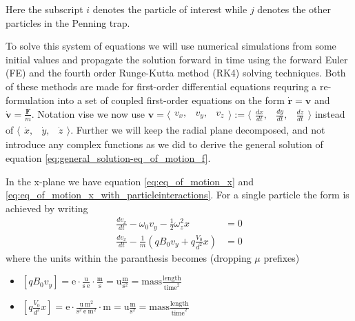 \documentclass[../main_proj3.tex]{subfiles}
\begin{document}
Here the subscript $i$ denotes the particle of interest while $j$ denotes the other particles in the Penning trap. 

To solve this system of equations we will use numerical simulations from some initial values and propagate the solution forward in time using the forward Euler (FE) and the fourth order Runge-Kutta method (RK4) solving techniques. Both of these methods are made for first-order differential equations requring a re-formulation into a set of coupled first-order equations on the form $\dot{\mathbf{r}} = \mathbf{v}$ and $ \dot{\mathbf{v}} = \frac{\mathbf{F}}{m}$. Notation vise we now use  $\mathbf{v} = \langle\begin{matrix}v_x, &v_y, &v_z \end{matrix}\rangle:= \langle\begin{matrix}\frac{dx}{dt},&\frac{dy}{dt}, &\frac{dz}{dt}\end{matrix}\rangle$ instead of $\langle\begin{matrix}\dot{x},&\dot y, & \dot z \end{matrix}\rangle$. Further we will keep the radial plane decomposed, and not introduce any complex functions as we did to derive the general solution of equation \eqref{eq:general_solution-eq_of_motion_f}. 

In the x-plane we have equation \eqref{eq:eq_of_motion_x} and \eqref{eq:eq_of_motion_x_with_particleinteractions}. For a single particle  the form is achieved by writing 
\begin{equation*}
\begin{split}
\frac{dv_x}{dt} -\omega_0 v_y - \frac{1}{2} \omega_z^{2} x &=  0 \\
\frac{dv_x}{dt} - \frac{1}{m} \left( 
qB_0 v_y + q \frac{V_0}{d^{2}} x
\right) & = 0 
\end{split}    
\end{equation*}
where the units within the paranthesis becomes (dropping $\mu$ prefixes)
\begin{itemize}
    \item $\left[q B_0 v_y\right] = \mathrm{e \cdot \frac{u}{s~e} \cdot \frac{m}{s} = u \frac{m}{s^{2}}} = \text{mass}\frac{\text{length}}{\text{time}^{2}}$
    \item $\left[q \frac{V_0}{d^{2}} x\right] = \mathrm{e \cdot \frac{u~m^{2}}{s^{2}~e~m^{2}} \cdot m = u \frac{m}{s^{2}} } = \text{mass}\frac{\text{length}}{\text{time}^{2}}$
\end{itemize}
\end{document}
